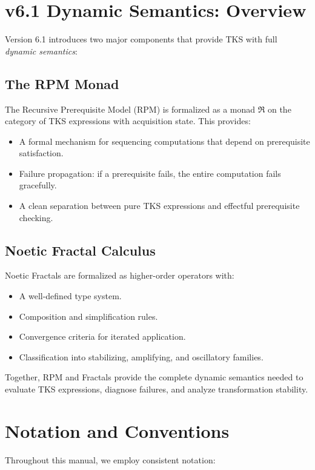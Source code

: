 \documentclass[11pt,twoside,openright]{book}
\theoremstyle{definition}
\theoremstyle{plain}
\theoremstyle{remark}
\newcommand{\RPM}{\mathfrak{R}}
\begin{document}
\section{v6.1 Dynamic Semantics: Overview}

Version 6.1 introduces two major components that provide TKS with full \emph{dynamic semantics}:

\subsection{The RPM Monad}

The Recursive Prerequisite Model (RPM) is formalized as a monad $\RPM$ on the category of TKS expressions with acquisition state. This provides:
\begin{itemize}
  \item A formal mechanism for sequencing computations that depend on prerequisite satisfaction.
  \item Failure propagation: if a prerequisite fails, the entire computation fails gracefully.
  \item A clean separation between pure TKS expressions and effectful prerequisite checking.
\end{itemize}

\subsection{Noetic Fractal Calculus}

Noetic Fractals are formalized as higher-order operators with:
\begin{itemize}
  \item A well-defined type system.
  \item Composition and simplification rules.
  \item Convergence criteria for iterated application.
  \item Classification into stabilizing, amplifying, and oscillatory families.
\end{itemize}

Together, RPM and Fractals provide the complete dynamic semantics needed to evaluate TKS expressions, diagnose failures, and analyze transformation stability.

\section{Notation and Conventions}
\label{sec:notation}

Throughout this manual, we employ consistent notation:
\end{document}
